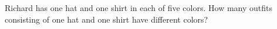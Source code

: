 Richard has one hat and one shirt in each of five colors. How many outfits consisting of one hat and one shirt have different colors?
